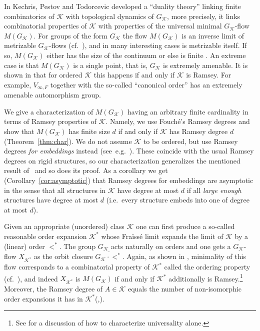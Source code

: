 \documentclass[12pt]{amsart}
\theoremstyle{plain}
\theoremstyle{definition}
\begin{document}
In \cite{kpt} Kechris, Pestov and Todorcevic  developed a ``duality theory'' \cite[$\S4$(A)]{kechris} 
linking finite combinatorics of ${\mathcal K}$ with topological dynamics of $G_{\mathcal K}$, more precisely, it links 
combinatorial properties of ${\mathcal K}$ with properties of the universal minimal $G_{\mathcal K}$-flow $M(G_{\mathcal K})$. For groups 
of the form $G_{\mathcal K}$ the flow $M(G_{\mathcal K})$ is an inverse limit of metrizable $G_{\mathcal K}$-flows (cf.~\cite[T1.5]{kpt}), 
and in many interesting cases is metrizable itself. If so, $M(G_{\mathcal K})$ 
either has the size of the continuum or else is finite \cite[$\S 1$(E)]{kpt}.
An extreme case is that $M(G_{\mathcal K})$ is a single point, that is, $G_{\mathcal K}$ is extremely amenable.
It is shown in \cite{kpt} that for ordered ${\mathcal K}$ this happens if and only if ${\mathcal K}$ is Ramsey.
For example, $V_{\infty,F}$ together with the so-called ``canonical order'' has an extremely amenable automorphism group.

We give a characterization of $M(G_{\mathcal K})$ having an arbitrary finite cardinality in terms of Ramsey properties of ${\mathcal K}$. 
Namely, we use Fouch\'e's Ramsey degrees \cite{fouche,fouche2,fouche3} and show that  $M(G_{\mathcal K})$ has finite 
size $d$ if and only if ${\mathcal K}$ has Ramsey degree $d$ (Theorem~\ref{thm:char}). We do not 
assume ${\mathcal K}$ to be ordered, but use Ramsey degrees {\em for embeddings} 
instead (see~e.g.\ \cite{nesetril,bodirsky}). These coincide with the usual Ramsey degrees on rigid 
structures, so our characterization generalizes the mentioned result of~\cite{kpt} and so does its proof. As a corollary we get (Corollary~\ref{cor:asymptotic})
that Ramsey degrees for embeddings are asymptotic in the sense that 
all structures in ${\mathcal K}$ have degree at most $d$ if all {\em large enough} structures have degree at most $d$ (i.e.\ every structure 
embeds into one of degree at most $d$).

Given an appropriate (unordered) class ${\mathcal K}$ one can first produce a so-called reasonable order expansion ${\mathcal K}^*$ whose Fra\"iss\'e 
limit expands the limit of ${\mathcal K}$ by a (linear) order $<^*$. The group $G_{\mathcal K}$ acts naturally on 
orders and one gets a $G_{\mathcal K}$-flow $X_{{\mathcal K}^*}$ as the orbit closure $\overline{G_{\mathcal K}\cdot <^*}$. Again, as shown in \cite{kpt}, 
minimality of this flow corresponds to a combinatorial property of ${\mathcal K}^*$ called the ordering property (cf.~\cite{nesetril}), 
and indeed $X_{{\mathcal K}^*}$ is $M(G_{\mathcal K})$ if and only if ${\mathcal K}^*$ additionally is Ramsey.\footnote{See \cite{nguyen2} for a discussion of how to characterize universality alone.} 
Moreover, the Ramsey degree of $A\in{\mathcal K}$ equals the number of non-isomorphic order expansions it 
has in ${\mathcal K}^*$(\cite[$\S10$]{kpt},\cite[$\S 4$]{nguyen}).
\end{document}
